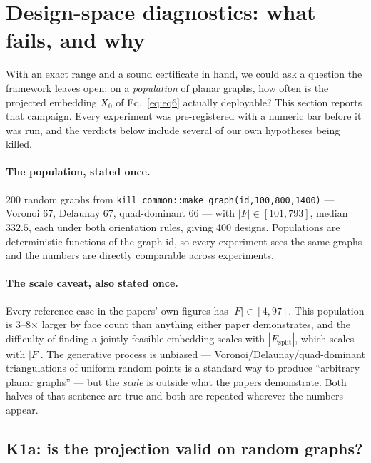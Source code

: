 \documentclass[11pt,a4paper]{article}
\theoremstyle{definition}
\newcommand{\Esplit}{E_{\mathrm{split}}}
\newcommand{\file}[1]{\texttt{\small #1}}
\begin{document}
\clearpage
\section{Design-space diagnostics: what fails, and why}
\label{sec:diagnostics}

With an exact range and a sound certificate in hand, we could ask a question the framework
leaves open: on a \emph{population} of planar graphs, how often is the projected embedding
$X_0$ of Eq.~\eqref{eq:eq6} actually deployable? This section reports that campaign. Every
experiment was pre-registered with a numeric bar before it was run, and the verdicts below
include several of our own hypotheses being killed.

\paragraph{The population, stated once.} 200 random graphs from
\file{kill\_common::make\_graph(id,100,800,1400)} --- Voronoi 67, Delaunay 67, quad-dominant
66 --- with $|F|\in[101,793]$, median $332.5$, each under both orientation rules, giving 400
designs. Populations are deterministic functions of the graph id, so every experiment sees
the same graphs and the numbers are directly comparable across experiments.

\paragraph{The scale caveat, also stated once.} Every reference case in the papers' own
figures has $|F|\in[4,97]$. This population is 3--8$\times$ larger by face count than
anything either paper demonstrates, and the difficulty of finding a jointly feasible
embedding scales with $|\Esplit|$, which scales with $|F|$. The generative process is
unbiased --- Voronoi/Delaunay/quad-dominant triangulations of uniform random points is a
standard way to produce ``arbitrary planar graphs'' --- but the \emph{scale} is outside what
the papers demonstrate. Both halves of that sentence are true and both are repeated wherever
the numbers appear.

\subsection{K1a: is the projection valid on random graphs?}
\end{document}
